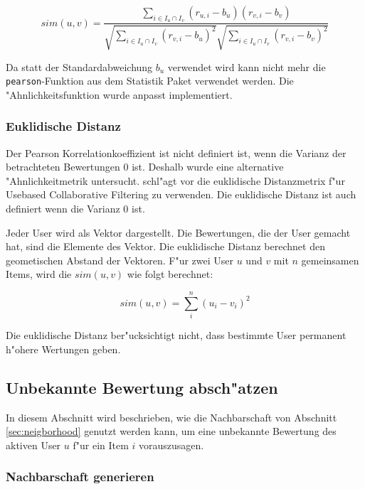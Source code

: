 \documentclass[a4paper, 12pt]{article}
\begin{document}
\begin{equation}
  \label{eq:advanced}
  sim(u,v)  = \frac{\sum_{i \in I_u \cap I_v}(r_{u,i} - b_u)(r_{v,i} - b_v)}{\sqrt{\sum_{i \in I_u \cap I_v}( r_{v,i} - b_u)^2}\sqrt{\sum_{i \in I_u \cap I_v}( r_{v,i} - b_v)^2}}
\end{equation}

Da statt der Standardabweichung $b_u$ verwendet wird kann nicht mehr die \verb|pearson|-Funktion aus dem Statistik Paket verwendet werden. Die "Ahnlichkeitsfunktion wurde anpasst implementiert.

\subsubsection{Euklidische Distanz}
\label{sec:euclid}

Der Pearson Korrelationkoeffizient ist nicht definiert ist, wenn die Varianz der betrachteten Bewertungen 0 ist. Deshalb wurde eine alternative "Ahnlichkeitmetrik untersucht. \cite{segaran} schl"agt vor die euklidische Distanzmetrix f"ur Usebased Collaborative Filtering zu verwenden. Die euklidische Distanz ist auch definiert wenn die Varianz 0 ist.

Jeder User wird als Vektor dargestellt. Die Bewertungen, die der User gemacht hat, sind die Elemente des Vektor. Die euklidische Distanz berechnet den geometischen Abstand der Vektoren. F"ur zwei User $u$ und $v$ mit $n$ gemeinsamen Items, wird die $sim(u,v)$ wie folgt berechnet:

\begin{equation}
  \label{eq:euclid}
 sim(u,v) = \sum_i^n (u_i - v_i )^2
\end{equation}

Die euklidische Distanz ber"ucksichtigt nicht, dass bestimmte User permanent h"ohere Wertungen geben.

\subsection{Unbekannte Bewertung absch"atzen}
\label{sec:compp}

In diesem Abschnitt wird beschrieben, wie die Nachbarschaft von Abschnitt \ref{sec:neigborhood} genutzt werden kann, um eine unbekannte Bewertung des aktiven User $u$ f"ur ein Item $i$ vorauszusagen.

\subsubsection{Nachbarschaft generieren}
\label{sec:generate}
\end{document}
